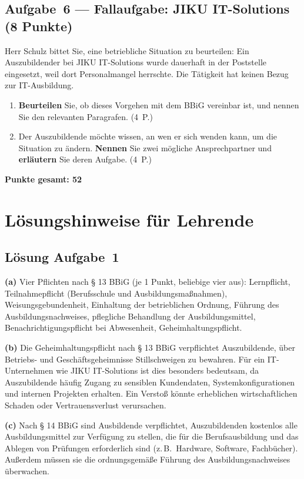 \documentclass[11pt, a4paper]{article}
\begin{document}
\subsection*{Aufgabe~6 --- Fallaufgabe: JIKU IT-Solutions (8 Punkte)}

Herr Schulz bittet Sie, eine betriebliche Situation zu beurteilen: Ein Auszubildender bei JIKU IT-Solutions wurde dauerhaft in der Poststelle eingesetzt, weil dort Personalmangel herrschte. Die Tätigkeit hat keinen Bezug zur IT-Ausbildung.

\begin{enumerate}[label=(\alph*)]
  \item \textbf{Beurteilen} Sie, ob dieses Vorgehen mit dem BBiG vereinbar ist, und nennen Sie den relevanten Paragrafen. \hfill (4~P.)

  \vspace{3.5cm}

  \item Der Auszubildende möchte wissen, an wen er sich wenden kann, um die Situation zu ändern. \textbf{Nennen} Sie zwei mögliche Ansprechpartner und \textbf{erläutern} Sie deren Aufgabe. \hfill (4~P.)

  \vspace{3.5cm}
\end{enumerate}

\vspace{1em}
\noindent\textbf{Punkte gesamt: 52}

\newpage
\section*{Lösungshinweise für Lehrende}\label{loesungen}

\subsection*{Lösung Aufgabe~1}
\begin{loesung}
\textbf{(a)} Vier Pflichten nach § 13 BBiG (je 1 Punkt, beliebige vier aus):
Lernpflicht, Teilnahmepflicht (Berufsschule und Ausbildungsmaßnahmen), Weisungsgebundenheit,
Einhaltung der betrieblichen Ordnung, Führung des Ausbildungsnachweises,
pflegliche Behandlung der Ausbildungsmittel, Benachrichtigungspflicht bei Abwesenheit,
Geheimhaltungspflicht.

\textbf{(b)} Die Geheimhaltungspflicht nach § 13 BBiG verpflichtet Auszubildende, über
Betriebs- und Geschäftsgeheimnisse Stillschweigen zu bewahren. Für ein IT-Unternehmen
wie JIKU IT-Solutions ist dies besonders bedeutsam, da Auszubildende häufig Zugang zu
sensiblen Kundendaten, Systemkonfigurationen und internen Projekten erhalten. Ein Verstoß
könnte erheblichen wirtschaftlichen Schaden oder Vertrauensverlust verursachen.

\textbf{(c)} Nach § 14 BBiG sind Ausbildende verpflichtet, Auszubildenden kostenlos alle
Ausbildungsmittel zur Verfügung zu stellen, die für die Berufsausbildung und das Ablegen von
Prüfungen erforderlich sind (z.\,B.\ Hardware, Software, Fachbücher). Außerdem müssen sie
die ordnungsgemäße Führung des Ausbildungsnachweises überwachen.
\end{loesung}
\end{document}
